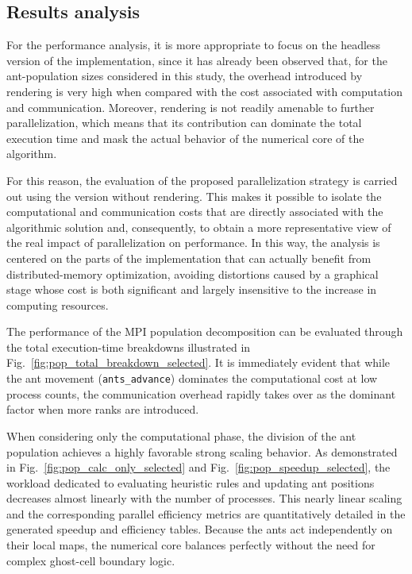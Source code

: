 \subsection{Results analysis}
For the performance analysis, it is more appropriate to focus on the headless version of the implementation, since it has already been observed that, for the ant-population sizes considered in this study, the overhead introduced by rendering is very high when compared with the cost associated with computation and communication. Moreover, rendering is not readily amenable to further parallelization, which means that its contribution can dominate the total execution time and mask the actual behavior of the numerical core of the algorithm.

For this reason, the evaluation of the proposed parallelization strategy is carried out using the version without rendering. This makes it possible to isolate the computational and communication costs that are directly associated with the algorithmic solution and, consequently, to obtain a more representative view of the real impact of parallelization on performance. In this way, the analysis is centered on the parts of the implementation that can actually benefit from distributed-memory optimization, avoiding distortions caused by a graphical stage whose cost is both significant and largely insensitive to the increase in computing resources.

The performance of the MPI population decomposition can be evaluated through the total execution-time breakdowns illustrated in Fig.~\ref{fig:pop_total_breakdown_selected}. It is immediately evident that while the ant movement (\texttt{ants\_advance}) dominates the computational cost at low process counts, the communication overhead rapidly takes over as the dominant factor when more ranks are introduced.

When considering only the computational phase, the division of the ant population achieves a highly favorable strong scaling behavior. As demonstrated in Fig.~\ref{fig:pop_calc_only_selected} and Fig.~\ref{fig:pop_speedup_selected}, the workload dedicated to evaluating heuristic rules and updating ant positions decreases almost linearly with the number of processes. This nearly linear scaling and the corresponding parallel efficiency metrics are quantitatively detailed in the generated speedup and efficiency tables. Because the ants act independently on their local maps, the numerical core balances perfectly without the need for complex ghost-cell boundary logic.

